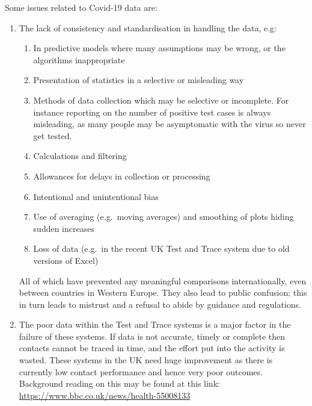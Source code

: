 Some issues related to Covid-19 data are:
\begin{enumerate}
\item The lack of \gls{consistency} and standardisation in handling the data, e.g:
  \begin{enumerate}[label=\color{dsiwgAccentColour}{\alph*.}]
  \item In predictive models where many assumptions may be wrong, or the algorithms inappropriate
  \item Presentation of statistics in a selective or misleading way
  \item Methods of data collection which may be selective or incomplete. For instance reporting on the number of positive test cases is always misleading, as many people may be asymptomatic with the virus so never get tested.
  \item Calculations and filtering
  \item Allowances for delays in collection or processing
  \item Intentional and unintentional bias
  \item Use of averaging (e.g.\ moving averages) and smoothing of plots hiding sudden increases
  \item Loss of data (e.g.\ in the recent UK Test and Trace system due to old versions of Excel)
  \end{enumerate}
All of which have prevented any meaningful comparisons internationally, even between countries in Western Europe. They also lead to public confusion; this in turn leads to mistrust and a refusal to abide by guidance and regulations. 

\item The poor data within the Test and Trace systems is a major factor in the failure of these systems. If data is not accurate, timely or complete then contacts cannot be traced in time, and the effort put into the activity is wasted. These systems in the UK need huge improvement as there is currently low contact performance and hence very poor outcomes. Background reading on this may be found at this link: \href{https://www.bbc.co.uk/news/health-55008133}{https://www.bbc.co.uk/news/health-55008133}
\end{enumerate}

